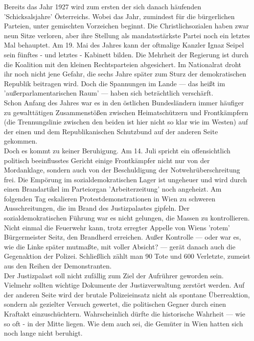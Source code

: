 \documentclass[letterpaper, 12pt]{article}
\begin{document}
Bereits das Jahr 1927 wird zum ersten der sich danach häufenden 'Schicksalsjahre' Österreichs. Wobei das Jahr, zumindest für die bürgerlichen Parteien, unter gemischten Vorzeichen beginnt. Die Christlichsozialen haben zwar neun Sitze verloren, aber ihre Stellung als mandatsstärkste Partei noch ein letztes Mal behauptet. Am 19. Mai des Jahres kann der oftmalige Kanzler Ignaz Seipel sein fünftes - und letztes - Kabinett bilden. Die Mehrheit der Regierung ist durch die Koalition mit den kleinen Rechtsparteien abgesichert. Im Nationalrat droht ihr noch nicht jene Gefahr, die sechs Jahre später zum Sturz der demokratischen Republik beitragen wird. Doch die Spannungen im Lande — das heißt im 'außerparlamentarischen Raum' — haben sich beträchtlich verschärft. \\
Schon Anfang des Jahres war es in den östlichen Bundesländern immer
häufiger zu gewalttätigen Zusammenstößen zwischen Heimatschützern und Frontkämpfern (die Trennungslinie zwischen den
beiden ist hier nicht so klar wie im Westen) auf der einen und
dem Republikanischen Schutzbund auf der anderen Seite gekommen. \\ Doch es kommt zu keiner Beruhigung. Am 14. Juli spricht ein offensichtlich politisch beeinflusstes Gericht einige Frontkämpfer nicht nur von der Mordanklage, sondern auch von der Beschuldigung der Notwehrüberschreitung frei. Die Empörung im sozialdemokratischen Lager ist ungeheuer und wird durch einen Brandartikel im Parteiorgan 'Arbeiterzeitung' noch angeheizt.
Am folgenden Tag eskalieren Protestdemonstrationen in Wien zu schweren Ausschreitungen, die im Brand des Justizpalastes gipfeln. Der sozialdemokratischen Führung war es nicht gelungen, die Massen zu kontrollieren. Nicht einmal die Feuerwehr kann, trotz erregter Appelle von Wiens 'rotem' Bürgermeister Seitz, den Brandherd erreichen. Außer Kontrolle — oder war es, wie die Linke später mutmaßte, mit voller Absicht? — gerät danach auch die Gegenaktion der Polizei. Schließlich zählt man 90 Tote und 600 Verletzte, zumeist aus den Reihen der Demonstranten. \\ Der Justizpalast soll nicht zufällig zum Ziel der Aufrührer geworden sein. Vielmehr sollten wichtige Dokumente der Justizverwaltung zerstört werden. Auf der anderen Seite wird der brutale Polizeieinsatz nicht als spontane Überreaktion, sondern als gezielter Versuch gewertet, die politischen Gegner durch einen Kraftakt einzuschüchtern. Wahrscheinlich dürfte die historische Wahrheit — wie so oft - in der Mitte liegen. Wie dem auch sei, die Gemüter in Wien hatten sich noch lange nicht beruhigt. \\
\end{document}
